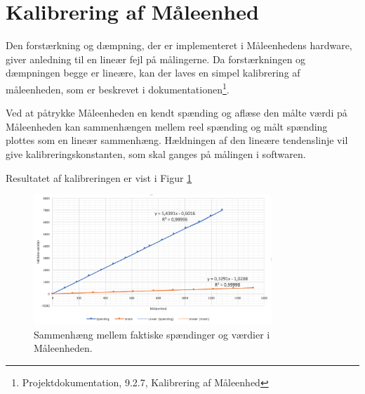 
\section{Kalibrering af Måleenhed}

Den forstærkning og dæmpning, der er implementeret i Måleenhedens hardware, giver anledning til en lineær fejl på målingerne. Da forstærkningen og dæmpningen begge er lineære, kan der laves en simpel kalibrering af måleenheden, som er beskrevet i dokumentationen\footnote{Projektdokumentation, 9.2.7, Kalibrering af Måleenhed}.\newline

Ved at påtrykke Måleenheden en kendt spænding og aflæse den målte værdi på Måleenheden kan sammenhængen mellem reel spænding og målt spænding plottes som en lineær sammenhæng. Hældningen af den lineære tendenslinje vil give kalibreringskonstanten, som skal ganges på målingen i softwaren. 

Resultatet af kalibreringen er vist i Figur \ref{fig:MEgraf}

\begin{figure}[H]
	\centering
	\includegraphics[width=0.80\textwidth]{figure/MEkalibreringgraf}
	\caption{Sammenhæng mellem faktiske spændinger og værdier i Måleenheden.}
	\label{fig:MEgraf}
\end{figure}